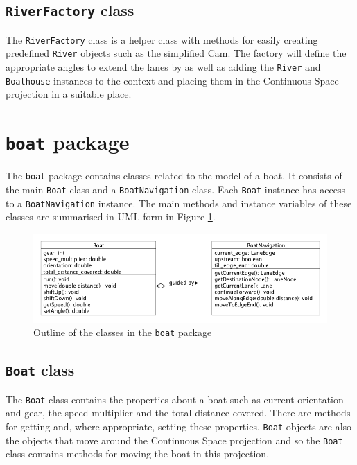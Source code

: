 \subsection{\texttt{RiverFactory} class}
The \texttt{RiverFactory} class is a helper class with methods for easily creating
predefined \texttt{River} objects such as the simplified Cam. The factory will
define the appropriate angles to extend the lanes by as well as adding
the \texttt{River} and \texttt{Boathouse} instances to the context and placing them in the
Continuous Space projection in a suitable place.

\section{\texttt{boat} package}
The \texttt{boat} package contains classes related to the model of a boat. It
consists of the main \texttt{Boat} class and a \texttt{BoatNavigation} class. Each \texttt{Boat} instance
has access to a \texttt{BoatNavigation} instance. The main methods and instance variables of these classes are summarised in UML form in Figure \ref{software:fig:boatUML}.

\begin{figure}
\begin{center}
  \includegraphics[scale=0.5]{images/boatpackage.png}
  \caption{Outline of the classes in the \texttt{boat} package}
  \label{software:fig:boatUML}
\end{center}
\end{figure}


\subsection{\texttt{Boat} class}
The \texttt{Boat} class contains the properties about a boat such as current
orientation and gear, the speed multiplier and the total distance covered. There are methods for
getting and, where appropriate, setting these properties. \texttt{Boat} objects are also the
objects that move around the Continuous Space projection and so the
\texttt{Boat} class contains methods for moving the boat in this
projection. 

